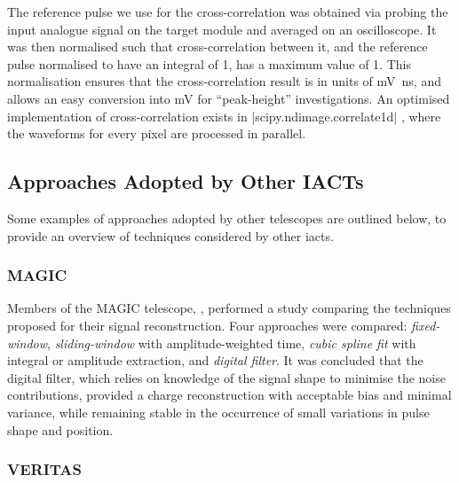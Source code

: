 The reference pulse we use for the cross-correlation was obtained via probing the input analogue signal on the \gls{target} module and averaged on an oscilloscope. It was then normalised such that cross-correlation between it, and the reference pulse normalised to have an integral of 1, has a maximum value of 1. This normalisation ensures that the cross-correlation result is in units of \si{mV ns}, and allows an easy conversion into \si{mV} for ``peak-height'' investigations.  An optimised implementation of cross-correlation exists in |scipy.ndimage.correlate1d| \cite{scipy-crosscorrelate}, where the waveforms for every pixel are processed in parallel.


\subsection{Approaches Adopted by Other IACTs}

Some examples of approaches adopted by other telescopes are outlined below, to provide an overview of techniques considered by other \glspl{iact}.

\subsubsection{MAGIC}

Members of the MAGIC telescope, \textcite{Albert2008}, performed a study comparing the techniques proposed for their signal reconstruction. Four approaches were compared: \textit{fixed-window}, \textit{sliding-window} with amplitude-weighted time, \textit{cubic spline fit} with integral or amplitude extraction, and \textit{digital filter}. It was concluded that the digital filter, which relies on knowledge of the signal shape to minimise the noise contributions, provided a charge reconstruction with acceptable bias and minimal variance, while remaining stable in the occurrence of small variations in pulse shape and position.

\subsubsection{VERITAS}

